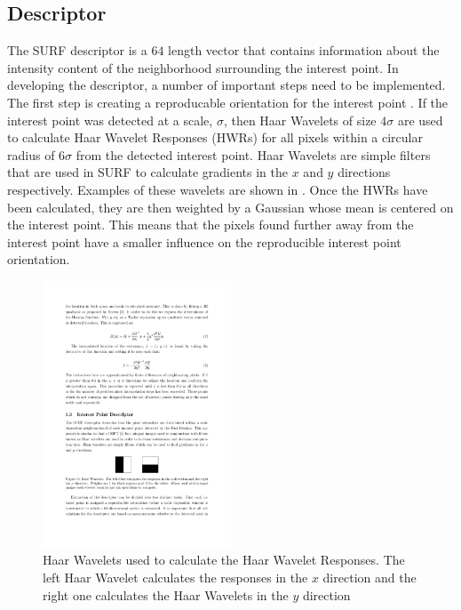 \documentclass{report}
\begin{document}

\subsection{Descriptor}
\label{sec:2dsurfdescribe}
The SURF descriptor is a $64$ length vector that contains information about the intensity content of the neighborhood surrounding the interest point. In developing the descriptor, a number of important steps need to be implemented. The first step is creating a reproducable orientation for the interest point \cite{Bay2008}. If the interest point was detected at a scale, $\sigma$, then Haar Wavelets of size $4\sigma$ are used to calculate Haar Wavelet Responses (HWRs) for all pixels within a circular radius of $6\sigma$ from the detected interest point.  Haar Wavelets are simple filters that are used in SURF to calculate gradients in the $x$ and $y$ directions respectively. Examples of these wavelets are shown in  \cite{Evans2009}. Once the HWRs have been calculated, they are then weighted by a Gaussian whose mean is centered on the interest point. This means that the pixels found further away from the interest point have a smaller influence on the reproducible interest point orientation.\\


\begin{figure}[h!] 
  \centering
    \includegraphics[width=0.5\textwidth]{../Drawings/methods/SURF2D_HaarWavelets.pdf}
    \caption{Haar Wavelets used to calculate the Haar Wavelet Responses. The left Haar Wavelet calculates the responses in the $x$ direction and the right one calculates the Haar Wavelets in the $y$ direction}
    \label{fig:haar}
\end{figure}
\end{document}
